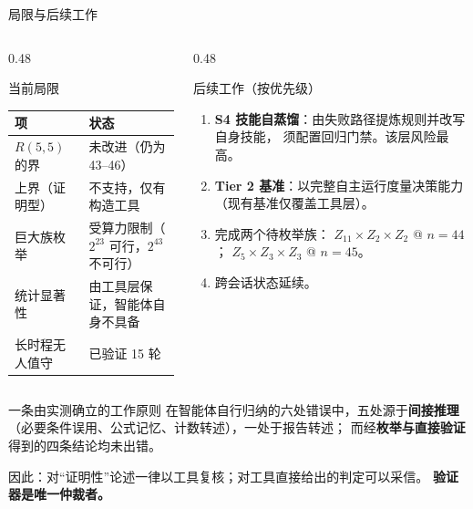 \documentclass[aspectratio=169,11pt]{beamer}
\begin{document}
\begin{frame}{局限与后续工作}
  \begin{columns}[T,onlytextwidth]
    \begin{column}{0.48\textwidth}
      \begin{block}{当前局限}
        \scriptsize
        \begin{tabular}{@{}p{}p{}@{}}
          \toprule
          项 & 状态 \\
          \midrule
          $R(5,5)$ 的界 & 未改进（仍为 43--46） \\
          上界（证明型） & 不支持，仅有构造工具 \\
          巨大族枚举 & 受算力限制（$2^{23}$ 可行，$2^{43}$ 不可行） \\
          统计显著性 & 由工具层保证，智能体自身不具备 \\
          长时程无人值守 & 已验证 15 轮 \\
          \bottomrule
        \end{tabular}
      \end{block}
    \end{column}

    \begin{column}{0.48\textwidth}
      \begin{block}{后续工作（按优先级）}
        \scriptsize
        \begin{enumerate}
          \item \textbf{S4 技能自蒸馏}：由失败路径提炼规则并改写自身技能，
            须配置回归门禁。该层风险最高。
          \item \textbf{Tier 2 基准}：以完整自主运行度量决策能力
            （现有基准仅覆盖工具层）。
          \item 完成两个待枚举族：
            $Z_{11}\times Z_2\times Z_2$ @ $n=44$；
            $Z_5\times Z_3\times Z_3$ @ $n=45$。
          \item 跨会话状态延续。
        \end{enumerate}
      \end{block}
    \end{column}
  \end{columns}

  \vspace{0.4em}
  \begin{alertblock}{一条由实测确立的工作原则}
    \footnotesize
    在智能体自行归纳的六处错误中，五处源于\textbf{间接推理}
    （必要条件误用、公式记忆、计数转述），一处于报告转述；
    而经\textbf{枚举与直接验证}得到的四条结论均未出错。

    \vspace{0.2em}
    因此：对“证明性”论述一律以工具复核；对工具直接给出的判定可以采信。
    \textbf{验证器是唯一仲裁者。}
  \end{alertblock}
\end{frame}
\end{document}

